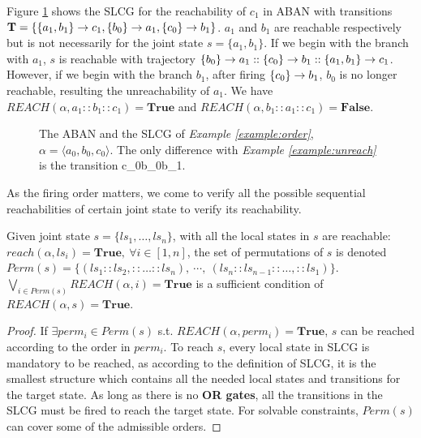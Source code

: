 \begin{example}\label{example:order}
Figure \ref{fig:unreach} shows the SLCG for the reachability of $c_1$ in ABAN with transitions $\mathbf{T}=\{\acm{a_1,b_1}{c_0}{c_1},\acm{b_0}{a_0}{a_1},\acm{c_0}{b_0}{b_1}\}$.
$a_1$ and $b_1$ are reachable respectively but is not necessarily for the joint state $s=\{a_1,b_1\}$.
If we begin with the branch with $a_1$, $s$ is reachable with trajectory $\acm{b_0}{a_0}{a_1}::\acm{c_0}{b_0}{b_1}::\acm{a_1,b_1}{c_0}{c_1}$. 
However, if we begin with the branch $b_1$, after firing $\acm{c_0}{b_0}{b_1}$, $b_0$ is no longer reachable, resulting the unreachability of $a_1$.
We have $REACH(\alpha,a_1::b_1::c_1)=\mathbf{True}$ and $REACH(\alpha,b_1::a_1::c_1)=\mathbf{False}$.
\end{example}

\begin{figure}[ht]
\centering

\caption[Ordering in SLCG]{The ABAN and the SLCG of \textit{Example \ref{example:order}}, $\alpha=\langle a_0,b_0,c_0\rangle$. 
The only difference with \textit{Example \ref{example:unreach}} is the transition \ac{c_0}{b_0}{b_1}.
}
\label{fig:unreach}
\end{figure}

As the firing order matters, we come to verify all the possible sequential reachabilities of certain joint state to verify its reachability.

\begin{proposition}\label{theoperm}
Given joint state $s=\{ls_1,\ldots,ls_n\}$, with all the local states in $s$ are reachable: $reach(\alpha,ls_i)=\mathbf{True},\ \forall i\in[1,n]$, the set of permutations of $s$ is denoted $Perm(s)=\{(ls_1::ls_2,::\ldots ::ls_n),\ \cdots,\ (ls_n::ls_{n-1}::\ldots,::ls_1)\}$. $\bigvee_{i\in Perm(s)} REACH(\alpha,i)=\mathbf{True}$ is a sufficient condition of $REACH(\alpha,s)=\mathbf{True}$.
\end{proposition}

\begin{proof}
If $\exists perm_i\in Perm(s)$ s.t. $REACH(\alpha,perm_i)=\mathbf{True}$, $s$ can be reached according to the order in $perm_i$.
To reach $s$, every local state in SLCG is mandatory to be reached, as according to the definition of SLCG, it is the smallest structure which contains all the needed local states and transitions for the target state. As long as there is no \textbf{OR gates}, all the transitions in the SLCG must be fired to reach the target state.
For solvable constraints, $Perm(s)$ can cover some of the admissible orders.
\end{proof}

